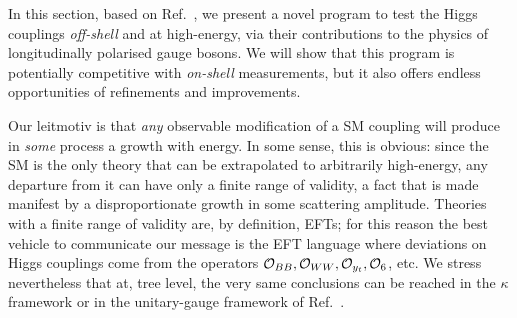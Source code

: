 \label{sec4:hwh}

In this section, based on Ref.~\cite{Henning:2018kys}, we present a novel program to test the Higgs couplings \emph{off-shell} and at high-energy, via their contributions to the physics of longitudinally polarised gauge bosons. We will show that this program is potentially competitive with \emph{on-shell} measurements, but it also offers endless opportunities of refinements and improvements. 


Our leitmotiv is that \emph{any} observable modification of a SM coupling will produce in \emph{some} process a growth with energy. In some sense, this is obvious: since the SM is the only theory that can be extrapolated to arbitrarily high-energy, any departure from it can have only a finite range of validity, a fact that is made manifest by a disproportionate growth in some scattering amplitude. Theories with a finite range of validity are, by definition, EFTs; for this reason the best vehicle to communicate our message is  the EFT language where deviations on Higgs couplings come from the operators $\mathcal{O}_{BB},\mathcal{O}_{WW},\mathcal{O}_{y_t},\mathcal{O}_{6}$, etc. We stress nevertheless that at, tree level, the very same conclusions can be reached in the $\kappa$ framework \cite{Heinemeyer:2013tqa} or in the unitary-gauge framework of Ref.~\cite{deFlorian:2016spz,Gupta:2014rxa}.



